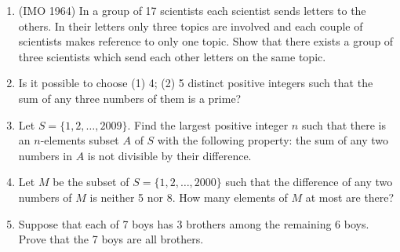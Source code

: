 \documentclass[12pt]{scrartcl}
\begin{document}
\begin{enumerate}
    \item (IMO 1964) In a group of 17 scientists each scientist sends letters to the others. In their letters only three topics are involved and each couple of scientists makes reference to only one topic. Show that there exists a group of three scientists which send each other letters on the same topic. 
    \item Is it possible to choose (1) 4; (2) 5 distinct positive integers such that the sum of any three numbers of them is a prime?
    \item Let $S = \{1, 2, \ldots, 2009\}$. Find the largest positive integer $n$ such that there is an $n$-elements subset $A$ of $S$ with the following property: the sum of any two numbers in $A$ is not divisible by their difference.
    \item Let $M$ be the subset of $S = \{1, 2, \ldots, 2000\}$ such that the difference of any two numbers of $M$ is neither 5 nor 8. How many elements of $M$ at most are there?
    \item Suppose that each of 7 boys has 3 brothers among the remaining 6 boys. Prove that the 7 boys are all brothers. 


\end{enumerate}
\end{document}
